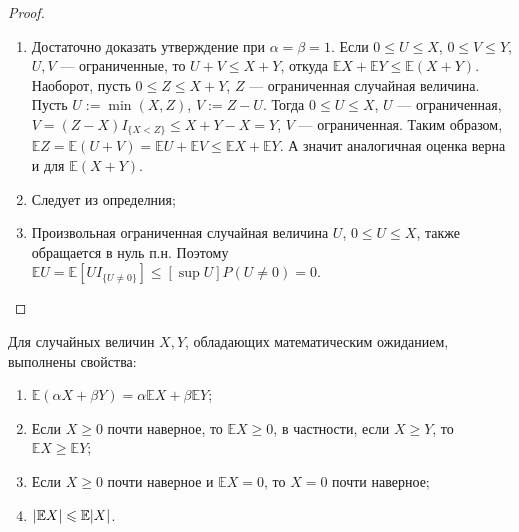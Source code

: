 \begin{proof}~
    \begin{enumerate}
        \item Достаточно доказать утверждение при $\alpha = \beta = 1$.
        Если $0 \leqslant U \leqslant X$, $0 \leqslant V \leqslant Y$, $U, V$ --- ограниченные, то $U + V \leqslant X + Y$, откуда $\mathbb{E} X + \mathbb{E} Y \leqslant \mathbb{E}(X + Y)$.
        Наоборот, пусть $0 \leqslant Z \leqslant X + Y$, $Z$ --- ограниченная случайная величина.
        Пусть $U := \min(X, Z)$, $V := Z - U$.
        Тогда $0 \leqslant U \leqslant X$, $U$ --- ограниченная, $V = (Z - X) I_{\{ X < Z \}} \leqslant X + Y - X = Y$, $V$ --- ограниченная.
        Таким образом, $\mathbb{E} Z = \mathbb{E}(U + V) = \mathbb{E} U + \mathbb{E} V \leqslant \mathbb{E} X + \mathbb{E} Y$.
        А значит аналогичная оценка верна и для $\mathbb{E}(X + Y)$.
        \item Следует из определния;
        \item Произвольная ограниченная случайная величина $U$, $0\le U\le X$, также обращается в нуль п.н.
        Поэтому $\mathbb{E} U = \mathbb{E}[UI_{\{ U \neq 0 \}}] \leqslant [\sup U] P(U \neq 0) = 0$.
    \end{enumerate}
\end{proof}

\begin{proposal*}
    Для случайных величин $X, Y$, обладающих математическим ожиданием,
    выполнены свойства:
    \begin{enumerate}
        \item $\mathbb{E}(\alpha X+\beta Y)=\alpha\mathbb{E}X+\beta\mathbb{E}Y$;
        \item Если $X \geqslant 0$ почти наверное, то $\mathbb{E}X\ge 0$, в частности, если $X \geqslant Y$, то $\mathbb{E} X \geqslant \mathbb{E} Y$;
        \item Если $X \geqslant 0$ почти наверное и $\mathbb{E}X = 0$, то $X = 0$ почти наверное;
        \item $\abs{\mathbb{E} X} \leqslant \mathbb{E} \abs{X}$.
    \end{enumerate}
\end{proposal*}

